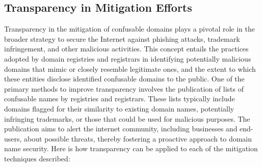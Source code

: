 \subsection{ Transparency in Mitigation Efforts}

Transparency in the mitigation of confusable domains plays a pivotal role in the broader strategy to secure the Internet against phishing attacks, trademark infringement, and other malicious activities. This concept entails the practices adopted by domain registries and registrars in identifying potentially malicious domains that mimic or closely resemble legitimate ones, and the extent to which these entities disclose identified confusable domains to the public. One of the primary methods to improve transparency involves the publication of lists of confusable names by registries and registrars. These lists typically include domains flagged for their similarity to existing domain names, potentially infringing trademarks, or those that could be used for malicious purposes. The publication aims to alert the internet community, including businesses and end-users, about possible threats, thereby fostering a proactive approach to domain name security. Here is how transparency can be applied to each of the mitigation techniques described:

